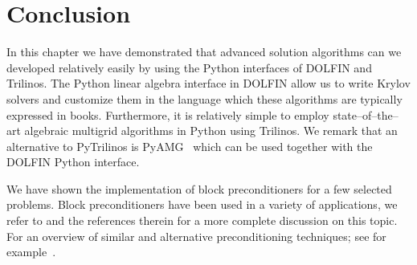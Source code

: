 \section{Conclusion}

In this chapter we have demonstrated that advanced solution algorithms
can we developed relatively easily by using the Python interfaces of
DOLFIN and Trilinos. The Python linear algebra interface in DOLFIN
allow us to write Krylov solvers and customize them in the language
which these algorithms are typically expressed in books.  Furthermore,
it is relatively simple to employ state--of--the--art algebraic
multigrid algorithms in Python using Trilinos.  We remark that an
alternative to PyTrilinos is PyAMG~\citep{BellOlsonSchroder2009} which
can be used together with the DOLFIN Python interface.

We have shown the implementation of block preconditioners for a few
selected problems.  Block preconditioners have been used in a variety
of applications, we refer to \citet{MardalWinther11} and the
references therein for a more complete discussion on this topic.  For
an overview of similar and alternative preconditioning techniques; see
for example~\citet{BenziGolubLiesen2005,ElmanSilvesterWathen2005}.

